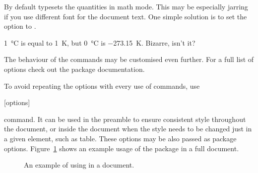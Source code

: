 By default  typesets the quantities in math mode. This may be
especially jarring if you use different font for the document text. One simple
solution is to set the  option to .
\begin{example}[examplewidth=0.4\linewidth]
\setmainfont{Liberation Sans}

\qty{1}{\degreeCelsius} is
equal to \qty{1}{\kelvin}, but
\qty[mode = text]{0}{\degreeCelsius}
is \qty[mode = text]{-273.15}{\kelvin}.
Bizarre, isn't it?
\end{example}

The behaviour of the commands may be customised even further. For a full list
of options check out the  package documentation.

To avoid repeating the options with every use of commands, use
\begin{lscommand}
[options]
\end{lscommand}
command. It can be used in the preamble to ensure consistent style throughout
the document, or inside the document when the style needs to be changed just
in a given element, such as table. These options may be also passed as package
options. Figure~\ref{sistandaloneexa} shows an example usage of the package in
a full document.
\begin{figure}[htp]
\caption{An example of using  in a document.}
\label{sistandaloneexa}
\end{figure}

